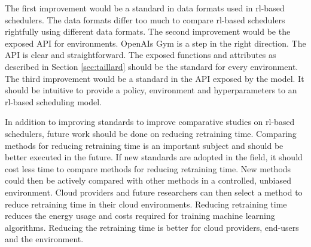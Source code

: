 The first improvement would be a standard in data formats used in \gls{rl}-based
schedulers. The data formats differ too much to compare \gls{rl}-based schedulers
rightfully using different data formats. The second improvement would be the
exposed API for environments. OpenAIs Gym is a step in the right direction.
The API is clear and straightforward. The exposed functions and attributes as
described in Section \ref{sec:taillard} should be the standard for every \jss
environment. The third improvement would be a standard in the API exposed by
the model. It should be intuitive to provide a policy, environment and
hyperparameters to an \gls{rl}-based scheduling model.

In addition to improving standards to improve comparative studies on \gls{rl}-based
schedulers, future work should be done on reducing retraining time. Comparing
methods for reducing retraining time is an important subject and should be
better executed in the future. If new standards are adopted in the field, it
should cost less time to compare methods for reducing
retraining time. New methods could then be actively compared with other
methods in a controlled, unbiased environment. Cloud providers and future
researchers can then select a method to reduce retraining time in their cloud
environments. Reducing retraining time reduces the energy usage and costs
required for training machine learning algorithms. Reducing the retraining
time is better for cloud providers, end-users and the environment.

